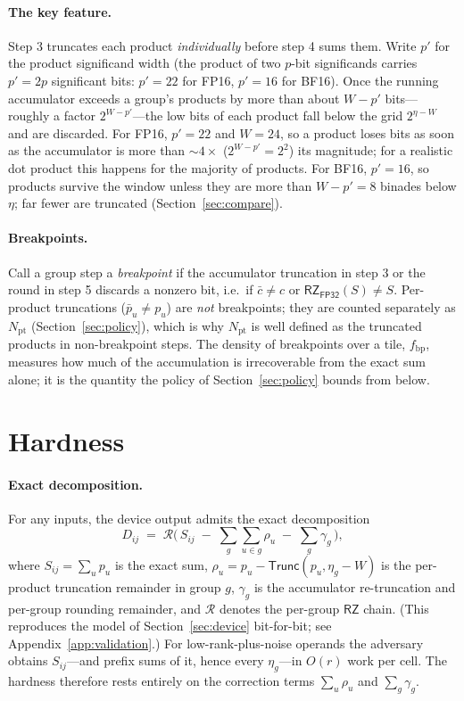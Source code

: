 \documentclass[11pt]{article}
\newcommand{\Trunc}{\textsf{Trunc}}
\newcommand{\RZ}{\textsf{RZ}}
\newcommand{\FP}[1]{\textsf{FP#1}}
\begin{document}
\paragraph{The key feature.} Step 3 truncates each product \emph{individually} before step 4
sums them. Write $p'$ for the product significand width (the product of two $p$-bit significands
carries $p'=2p$ significant bits: $p'=22$ for \FP{16}, $p'=16$ for \textsf{BF16}). Once the running
accumulator exceeds a group's products by more than about $W-p'$ bits---roughly a factor
$2^{W-p'}$---the low bits of each product fall below the grid $2^{\eta-W}$ and are discarded. For
\FP{16}, $p'=22$ and $W=24$, so a product loses bits as soon as the accumulator is more than
$\sim\!4\times$ ($2^{W-p'}=2^2$) its magnitude; for a realistic dot product this happens for the
majority of products. For \textsf{BF16}, $p'=16$, so products survive the window unless they are
more than $W-p'=8$ binades below $\eta$; far fewer are truncated (Section~\ref{sec:compare}).

\paragraph{Breakpoints.} Call a group step a \emph{breakpoint} if the accumulator truncation in
step 3 or the round in step 5 discards a nonzero bit, i.e.\ if $\bar c\neq c$ or
$\RZ_{\FP{32}}(S)\neq S$. Per-product truncations ($\bar p_u\neq p_u$) are \emph{not} breakpoints;
they are counted separately as $N_{\text{pt}}$ (Section~\ref{sec:policy}), which is why $N_{\text{pt}}$
is well defined as the truncated products in non-breakpoint steps. The density of breakpoints over a
tile, $f_{\text{bp}}$, measures how much of the accumulation is irrecoverable from the exact sum
alone; it is the quantity the policy of Section~\ref{sec:policy} bounds from below.

\section{Hardness}\label{sec:hardness}

\paragraph{Exact decomposition.} For any inputs, the device output admits the exact decomposition
\begin{equation}\label{eq:decomp}
D_{ij} \;=\; \mathcal R\Big(\, S_{ij} \;-\; \sum_{g}\sum_{u\in g}\rho_u \;-\; \sum_g \gamma_g \,\Big),
\end{equation}
where $S_{ij}=\sum_u p_u$ is the exact sum, $\rho_u = p_u - \Trunc(p_u,\eta_g-W)$ is the
per-product truncation remainder in group $g$, $\gamma_g$ is the accumulator re-truncation and
per-group rounding remainder, and $\mathcal R$ denotes the per-group $\RZ$ chain. (This
reproduces the model of Section~\ref{sec:device} bit-for-bit; see Appendix~\ref{app:validation}.)
For low-rank-plus-noise operands the adversary obtains $S_{ij}$---and prefix sums of it, hence
every $\eta_g$---in $O(r)$ work per cell. The hardness therefore rests entirely on the correction
terms $\sum_u\rho_u$ and $\sum_g\gamma_g$.
\end{document}

